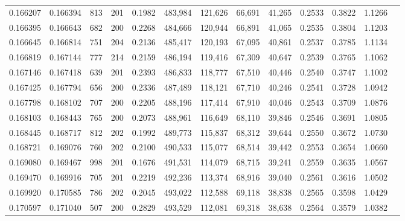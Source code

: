 \begin{tabular}{rrrrrrrrrrrrr}
0.166207 & 0.166394 &   813 & 201 &                                     0.1982 & 483,984 & 121,626 &  66,691 &  41,265 & 0.2533 & 0.3822 & 1.1266 \\
0.166395 & 0.166643 &   682 & 200 &                                     0.2268 & 484,666 & 120,944 &  66,891 &  41,065 & 0.2535 & 0.3804 & 1.1203 \\
0.166645 & 0.166814 &   751 & 204 &                                     0.2136 & 485,417 & 120,193 &  67,095 &  40,861 & 0.2537 & 0.3785 & 1.1134 \\
0.166819 & 0.167144 &   777 & 214 &                                     0.2159 & 486,194 & 119,416 &  67,309 &  40,647 & 0.2539 & 0.3765 & 1.1062 \\
0.167146 & 0.167418 &   639 & 201 &                                     0.2393 & 486,833 & 118,777 &  67,510 &  40,446 & 0.2540 & 0.3747 & 1.1002 \\
0.167425 & 0.167794 &   656 & 200 &                                     0.2336 & 487,489 & 118,121 &  67,710 &  40,246 & 0.2541 & 0.3728 & 1.0942 \\
0.167798 & 0.168102 &   707 & 200 &                                     0.2205 & 488,196 & 117,414 &  67,910 &  40,046 & 0.2543 & 0.3709 & 1.0876 \\
0.168103 & 0.168443 &   765 & 200 &                                     0.2073 & 488,961 & 116,649 &  68,110 &  39,846 & 0.2546 & 0.3691 & 1.0805 \\
0.168445 & 0.168717 &   812 & 202 &                                     0.1992 & 489,773 & 115,837 &  68,312 &  39,644 & 0.2550 & 0.3672 & 1.0730 \\
0.168721 & 0.169076 &   760 & 202 &                                     0.2100 & 490,533 & 115,077 &  68,514 &  39,442 & 0.2553 & 0.3654 & 1.0660 \\
0.169080 & 0.169467 &   998 & 201 &                                     0.1676 & 491,531 & 114,079 &  68,715 &  39,241 & 0.2559 & 0.3635 & 1.0567 \\
0.169470 & 0.169916 &   705 & 201 &                                     0.2219 & 492,236 & 113,374 &  68,916 &  39,040 & 0.2561 & 0.3616 & 1.0502 \\
0.169920 & 0.170585 &   786 & 202 &                                     0.2045 & 493,022 & 112,588 &  69,118 &  38,838 & 0.2565 & 0.3598 & 1.0429 \\
0.170597 & 0.171040 &   507 & 200 &                                     0.2829 & 493,529 & 112,081 &  69,318 &  38,638 & 0.2564 & 0.3579 & 1.0382 \\

\end{tabular}
